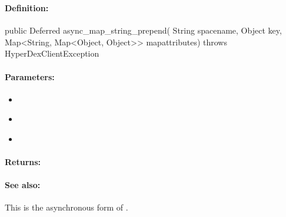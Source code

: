 \pagebreak
\subsubsection{}
\label{api:java:async_map_string_prepend}


\paragraph{Definition:}
\begin{javacode}
public Deferred async_map_string_prepend(
        String spacename,
        Object key,
        Map<String, Map<Object, Object>> mapattributes) throws HyperDexClientException
\end{javacode}

\paragraph{Parameters:}
\begin{itemize}[noitemsep]
\item {}\\

\item {}\\

\item {}\\

\end{itemize}

\paragraph{Returns:}


\paragraph{See also:}  This is the asynchronous form of .

\pagebreak
\subsubsection{}
\label{api:java:cond_map_string_prepend}


